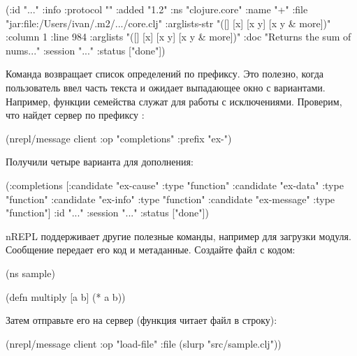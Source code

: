 \begin{english}
  \begin{clojure}
({:id "..."
  :info {:protocol ""
         :added "1.2"
         :ns "clojure.core"
         :name "+"
         :file "jar:file:/Users/ivan/.m2/.../core.clj"
         :arglists-str "([] [x] [x y] [x y & more])"
         :column 1
         :line 984
         :arglists "([] [x] [x y] [x y & more])"
         :doc "Returns the sum of nums..."}
  :session "..."
  :status ["done"]})
  \end{clojure}
\end{english}

Команда  возвращает список определений по префиксу. Это полезно, когда пользователь ввел часть текста и ожидает выпадающее окно с вариантами. Например, функции семейства  служат для работы с исключениями. Проверим, что найдет сервер по префиксу :

\begin{english}
  \begin{clojure}
(nrepl/message client
               {:op "completions" :prefix "ex-"})
  \end{clojure}
\end{english}

Получили четыре варианта для дополнения:

\begin{english}
  \begin{clojure}
({:completions
  [{:candidate "ex-cause" :type "function"}
   {:candidate "ex-data" :type "function"}
   {:candidate "ex-info" :type "function"}
   {:candidate "ex-message" :type "function"}]
  :id "..."
  :session "..."
  :status ["done"]})
  \end{clojure}
\end{english}

nREPL поддерживает другие полезные команды, например  для загрузки модуля. Сообщение передает его код и метаданные. Создайте файл  с кодом:

\begin{english}
  \begin{clojure}
(ns sample)

(defn multiply [a b]
  (* a b))
  \end{clojure}
\end{english}

Затем отправьте его на сервер (функция  читает файл в строку):

\begin{english}
  \begin{clojure}
(nrepl/message client {:op "load-file"
                       :file (slurp "src/sample.clj")})
  \end{clojure}
\end{english}

